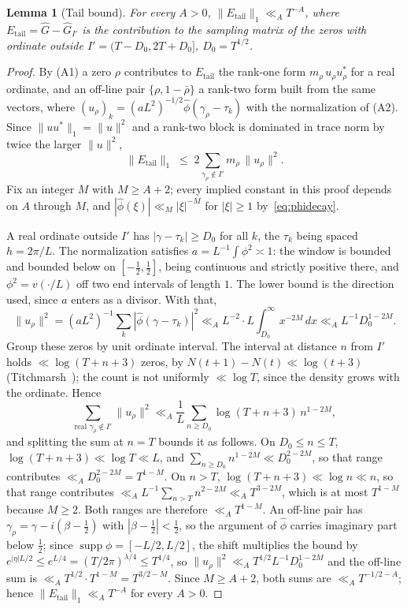\documentclass[11pt]{article}
\newtheorem{lemma}[theorem]{Lemma}
\theoremstyle{definition}
\begin{document}
\begin{lemma}[Tail bound]\label{lem:tail}
For every $A>0$, $\|E_{\mathrm{tail}}\|_1\ll_A T^{-A}$, where
$E_{\mathrm{tail}}=\widehat G-\widehat G_{I'}$ is the contribution to the sampling
matrix of the zeros with ordinate outside $I'=(T-D_0,2T+D_0]$, $D_0=T^{1/2}$.
\end{lemma}

\begin{proof}
By (A1) a zero $\rho$ contributes to $E_{\mathrm{tail}}$ the rank-one form
$m_\rho\,u_\rho u_\rho^{*}$ for a real ordinate, and an off-line pair
$\{\rho,1-\bar\rho\}$ a rank-two form built from the same vectors, where
$(u_\rho)_k=(aL^2)^{-1/2}\widehat\phi(\gamma_\rho-\tau_k)$ with the normalization of
(A2). Since $\|uu^{*}\|_1=\|u\|^2$ and a rank-two block is dominated in trace norm
by twice the larger $\|u\|^2$,
\[
  \|E_{\mathrm{tail}}\|_1\;\le\;2\sum_{\gamma_\rho\notin I'}m_\rho\,\|u_\rho\|^2 .
\]
Fix an integer $M$ with $M\ge A+2$; every implied constant in this proof depends on $A$
through $M$, and $|\widehat\phi(\xi)|\ll_M|\xi|^{-M}$ for $|\xi|\ge1$
by~\eqref{eq:phidecay}.

A real ordinate outside $I'$ has $|\gamma-\tau_k|\ge D_0$ for all $k$, the $\tau_k$
being spaced $h=2\pi/L$. The normalization satisfies $a=L^{-1}\!\int\phi^2\asymp1$:
the window is bounded and bounded below on $[-\tfrac12,\tfrac12]$, being continuous
and strictly positive there, and $\phi^2=v(\cdot/L)$ off two end intervals of
length $1$. The lower bound is the direction used, since $a$ enters as a divisor.
With that,
\[
  \|u_\rho\|^2=(aL^2)^{-1}\!\sum_k|\widehat\phi(\gamma-\tau_k)|^2
  \ll_A L^{-2}\cdot L\!\!\int_{D_0}^\infty\! x^{-2M}\,dx\ll_A L^{-1}D_0^{1-2M}.
\]
Group these zeros by unit ordinate interval. The interval at distance $n$ from
$I'$ holds $\ll\log(T+n+3)$ zeros, by $N(t+1)-N(t)\ll\log(t+3)$
(Titchmarsh~\cite{Tit86}); the count is not uniformly $\ll\log T$, since the
density grows with the ordinate. Hence
\[
  \sum_{\text{real }\gamma_\rho\notin I'}\!\!\|u_\rho\|^2
  \ll_A \frac1L\sum_{n\ge D_0}\log(T+n+3)\,n^{1-2M},
\]
and splitting the sum at $n=T$ bounds it as follows. On $D_0\le n\le T$,
$\log(T+n+3)\ll\log T\ll L$, and $\sum_{n\ge D_0}n^{1-2M}\ll D_0^{2-2M}$, so that
range contributes $\ll_A D_0^{2-2M}=T^{1-M}$. On $n>T$, $\log(T+n+3)\ll\log n\ll n$,
so that range contributes $\ll_A L^{-1}\sum_{n>T}n^{2-2M}\ll_A T^{3-2M}$, which is
at most $T^{1-M}$ because $M\ge2$. Both ranges are therefore $\ll_A T^{1-M}$.
An off-line pair has $\gamma_\rho=\gamma-i(\beta-\tfrac12)$ with
$|\beta-\tfrac12|<\tfrac12$, so the argument of $\widehat\phi$ carries imaginary part
below $\tfrac12$; since $\operatorname{supp}\phi=[-L/2,L/2]$, the shift multiplies the
bound by $e^{|\eta|L/2}\le e^{L/4}=(T/2\pi)^{\lambda/4}\le T^{1/4}$, so
$\|u_\rho\|^2\ll_A T^{1/2}L^{-1}D_0^{1-2M}$ and the off-line sum is
$\ll_A T^{1/2}\cdot T^{1-M}=T^{3/2-M}$. Since $M\ge A+2$, both sums are
$\ll_A T^{-1/2-A}$; hence $\|E_{\mathrm{tail}}\|_1\ll_A T^{-A}$ for every $A>0$.
\end{proof}
\end{document}

